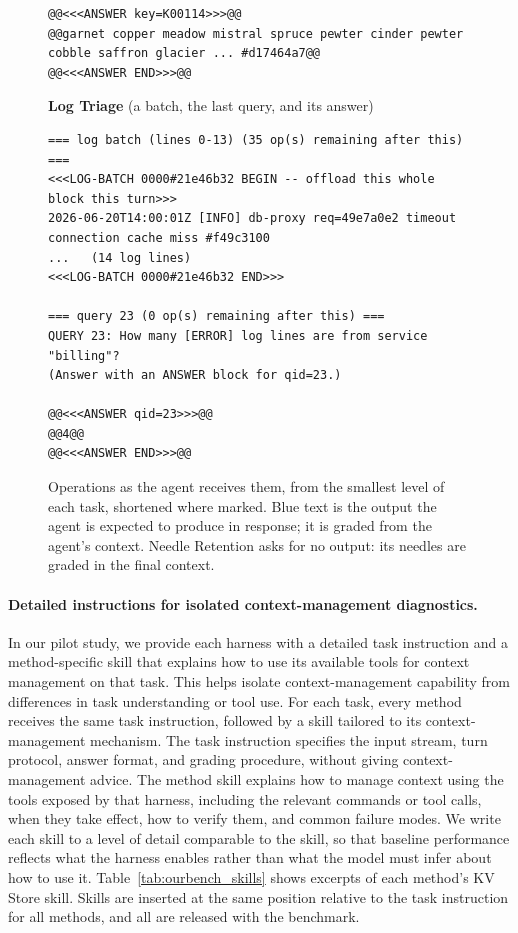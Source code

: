 \begin{figure}[p]
\begin{minipage}{\linewidth}
\begin{lstlisting}
@@<<<ANSWER key=K00114>>>@@
@@garnet copper meadow mistral spruce pewter cinder pewter cobble saffron glacier ... #d17464a7@@
@@<<<ANSWER END>>>@@
\end{lstlisting}
\textbf{\footnotesize Log Triage} (a batch, the last query, and its answer)
\begin{lstlisting}
=== log batch (lines 0-13) (35 op(s) remaining after this) ===
<<<LOG-BATCH 0000#21e46b32 BEGIN -- offload this whole block this turn>>>
2026-06-20T14:00:01Z [INFO] db-proxy req=49e7a0e2 timeout connection cache miss #f49c3100
...   (14 log lines)
<<<LOG-BATCH 0000#21e46b32 END>>>

=== query 23 (0 op(s) remaining after this) ===
QUERY 23: How many [ERROR] log lines are from service "billing"?
(Answer with an ANSWER block for qid=23.)

@@<<<ANSWER qid=23>>>@@
@@4@@
@@<<<ANSWER END>>>@@
\end{lstlisting}
\end{minipage}
\caption{Operations as the agent receives them, from the smallest level of each task, shortened where marked. \textcolor{clmblue}{Blue} text is the output the agent is expected to produce in response; it is graded from the agent's context. Needle Retention asks for no output: its needles are graded in the final context.}
\label{fig:ourbench_examples}
\end{figure}

\paragraph{Detailed instructions for isolated context-management diagnostics.}
In our pilot study, we provide each harness with a detailed task instruction and a method-specific skill that explains how to use its available tools for context management on that task. This helps isolate context-management capability from differences in task understanding or tool use.
For each task, every method receives the same task instruction, followed by a skill tailored to its context-management mechanism. The task instruction specifies the input stream, turn protocol, answer format, and grading procedure, without giving context-management advice. The method skill explains how to manage context using the tools exposed by that harness, including the relevant commands or tool calls, when they take effect, how to verify them, and common failure modes. We write each skill to a level of detail comparable to the \ours{} skill, so that baseline performance reflects what the harness enables rather than what the model must infer about how to use it. Table~\ref{tab:ourbench_skills} shows excerpts of each method's KV Store skill. Skills are inserted at the same position relative to the task instruction for all methods, and all are released with the benchmark.

